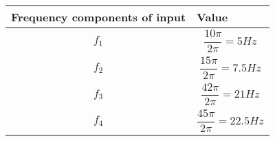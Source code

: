 \begin{tabular}{|p{4cm}|p{2.8cm}|}
    \hline
    Frequency components of input & Value   \\ \hline 
    $$f_1$$ & $$\frac{10\pi}{2\pi}=5Hz$$ \\ \hline
    $$f_2$$ & $$\frac{15\pi}{2\pi}=7.5Hz$$  \\ \hline
    $$f_3$$ & $$\frac{42\pi}{2\pi}=21Hz$$  \\ \hline
    $$f_4$$ & $$\frac{45\pi}{2\pi}=22.5Hz$$    \\ \hline
\end{tabular}
